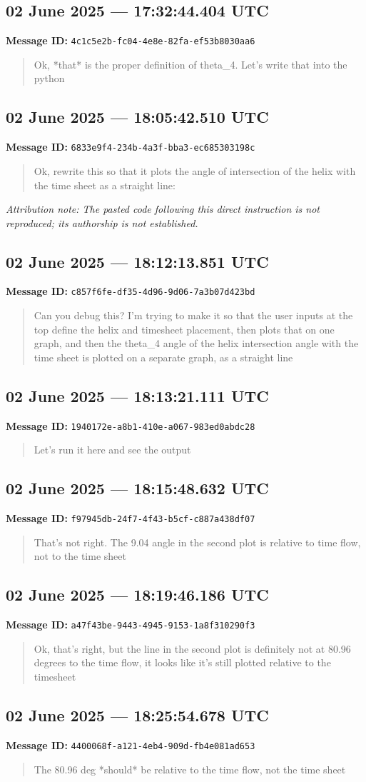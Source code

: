 \documentclass[11pt,letterpaper]{article}
\newcommand{\messageentry}[3]{%
  \Needspace{7\baselineskip}
  \subsection*{#1}
  {\small\textbf{Message ID:} \texttt{#2}}
  \vspace{2pt}
}
\begin{document}
\messageentry{02 June 2025 --- 17:32:44.404 UTC}{4c1c5e2b-fc04-4e8e-82fa-ef53b8030aa6}{}
\begin{quote}\small
Ok, *that* is the proper definition of theta\_4. Let's write that into the python
\end{quote}

\messageentry{02 June 2025 --- 18:05:42.510 UTC}{6833e9f4-234b-4a3f-bba3-ec685303198c}{}
\begin{quote}\small
Ok, rewrite this so that it plots the angle of intersection of the helix with the time sheet as a straight line:
\end{quote}

{\small\emph{Attribution note: The pasted code following this direct instruction is not reproduced; its authorship is not established.}}

\messageentry{02 June 2025 --- 18:12:13.851 UTC}{c857f6fe-df35-4d96-9d06-7a3b07d423bd}{}
\begin{quote}\small
Can you debug this? I'm trying to make it so that the user inputs at the top define the helix and timesheet placement, then plots that on one graph, and then the theta\_4 angle of the helix intersection angle with the time sheet is plotted on a separate graph, as a straight line
\end{quote}

\messageentry{02 June 2025 --- 18:13:21.111 UTC}{1940172e-a8b1-410e-a067-983ed0abdc28}{}
\begin{quote}\small
Let's run it here and see the output
\end{quote}

\messageentry{02 June 2025 --- 18:15:48.632 UTC}{f97945db-24f7-4f43-b5cf-c887a438df07}{}
\begin{quote}\small
That's not right. The 9.04 angle in the second plot is relative to time flow, not to the time sheet
\end{quote}

\messageentry{02 June 2025 --- 18:19:46.186 UTC}{a47f43be-9443-4945-9153-1a8f310290f3}{}
\begin{quote}\small
Ok, that's right, but the line in the second plot is definitely not at 80.96 degrees to the time flow, it looks like it's still plotted relative to the timesheet
\end{quote}

\messageentry{02 June 2025 --- 18:25:54.678 UTC}{4400068f-a121-4eb4-909d-fb4e081ad653}{}
\begin{quote}\small
The 80.96 deg *should* be relative to the time flow, not the time sheet
\end{quote}
\end{document}
